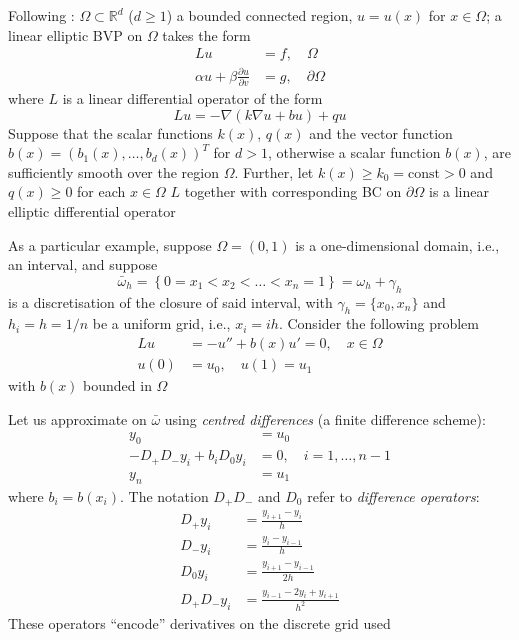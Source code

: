 \documentclass{beamer}
\def\IR{\mathbb{R}}
\begin{document}
\begin{frame}
Following \cite{Windisch1989}: $\Omega\subset\IR^d$ ($d\geq 1$) a bounded connected region, $u=u(x)$ for $x\in\Omega$; a linear elliptic BVP on $\Omega$ takes the form 
\begin{subequations}\label{sys:PDE}
\begin{align}
Lu &= f,\quad \Omega \\
\alpha u+\beta \frac{\partial u}{\partial v} &= g, \quad \partial\Omega
\end{align}
\end{subequations}
where $L$ is a linear differential operator of the form
\[
Lu = -\nabla(k\nabla u+bu)+qu
\]
Suppose that the scalar functions $k(x)$, $q(x)$ and the vector function
$b(x)=(b_1(x),\ldots,b_d(x))^T$ for $d>1$, otherwise a scalar function
$b(x)$, are sufficiently smooth over the region $\Omega$. 
Further, let $k(x)\geq k_0=\textrm{const} > 0$ and $q(x)\geq 0$ for each $x\in\Omega$
\vfill
$L$ together with corresponding BC on $\partial\Omega$ is a linear elliptic differential operator
\end{frame}


\begin{frame} 
As a particular example, suppose $\Omega=(0,1)$ is a one-dimensional domain, i.e., an interval, and suppose
\[
\bar{\omega}_h=
\left\{
0=x_1<x_2<\ldots<x_n=1
\right\}
=\omega_h+\gamma_h
\]
is a discretisation of the closure of said interval, with $\gamma_h=\{x_0,x_n\}$ and $h_i=h=1/n$ be a uniform grid, i.e., $x_i=ih$. Consider the following problem
\begin{subequations}
\begin{align}
Lu &= -u''+b(x)u'=0,\quad x\in\Omega \\
u(0) &= u_0,\quad u(1)=u_1
\end{align}
\end{subequations}
with $b(x)$ bounded in $\Omega$
\end{frame}

\begin{frame} 
Let us approximate on $\bar{\omega}$ using \emph{centred differences} (a finite difference scheme):
\begin{subequations}
\begin{align}
y_0 &= u_0 \\
-D_+D_-y_i +b_iD_0y_i &= 0, \quad i=1,\ldots,n-1 \\
y_n &= u_1
\end{align}
\end{subequations}
where $b_i=b(x_i)$. The notation $D_+D_-$ and $D_0$ refer to \emph{difference operators}:
\begin{subequations}
\begin{align}
D_+y_i &= \frac{y_{i+1}-y_i}{h} \\
D_-y_i &= \frac{y_{i}-y_{i-1}}{h} \\
D_0y_i &= \frac{y_{i+1}-y_{i-1}}{2h} \\
D_+D_-y_i &= \frac{y_{i-1}-2y_i+y_{i+1}}{h^2}
\end{align}
\end{subequations}
These operators ``encode'' derivatives on the discrete grid used
\end{frame}
\end{document}
